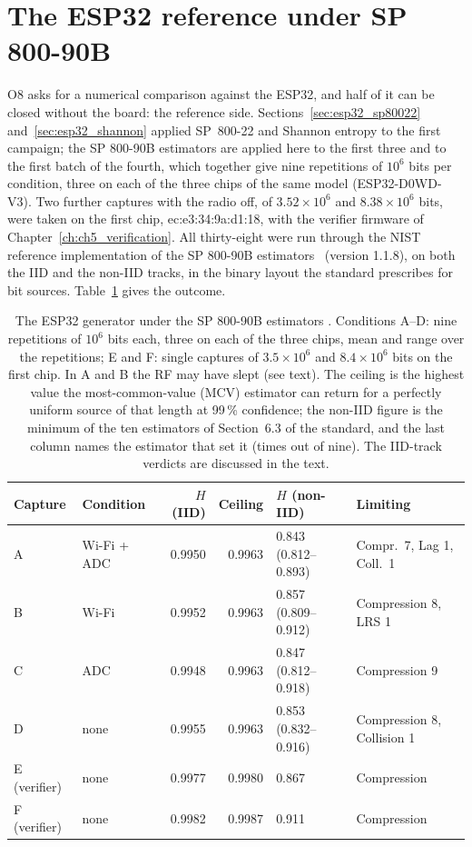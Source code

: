 \section{The ESP32 reference under SP 800-90B}
\label{sec:esp32_90b}

O8 asks for a numerical comparison against the ESP32, and half of it can
be closed without the board: the reference side.
Sections~\ref{sec:esp32_sp80022} and~\ref{sec:esp32_shannon} applied
SP~800-22 and Shannon entropy to the first campaign; the SP 800-90B
estimators are applied here to the first three and to the first batch of
the fourth, which together give nine repetitions of $10^6$ bits per
condition, three on each of the three chips of the same model
(ESP32-D0WD-V3). Two further captures with the radio off, of $3.52\times10^6$
and $8.38\times10^6$ bits, were taken on the first chip,
ec:e3:34:9a:d1:18, with the verifier firmware of
Chapter~\ref{ch:ch5_verification}. All
thirty-eight were run through the \ac{NIST} reference implementation of the
SP 800-90B estimators~\cite{nist_ea_github, turan_2018_sp80090b}
(version 1.1.8), on both the IID and the non-IID tracks, in the binary
layout the standard prescribes for bit sources. Table~\ref{tab:esp32_90b}
gives the outcome.

\begin{table}[htbp]
\centering
\caption{The ESP32 generator under the SP 800-90B estimators \meas{}.
Conditions A--D: nine repetitions of $10^6$ bits each, three on each of
the three chips, mean and range over the repetitions; E and F: single
captures of $3.5\times10^6$ and $8.4\times10^6$ bits on the first chip.
In A and B the RF may have slept (see text). The ceiling is the
highest value the most-common-value (MCV) estimator can return for a
perfectly uniform source of that length at 99\,\% confidence; the non-IID
figure is the minimum of the ten estimators of Section~6.3 of the
standard, and the last column names the estimator that set it (times out
of nine). The IID-track verdicts are discussed in the text.}
\label{tab:esp32_90b}
\footnotesize
\begin{tabular}{@{}llrrll@{}}
\toprule
Capture & Condition & $H$ (IID) & Ceiling & $H$ (non-IID) & Limiting \\
\midrule
A & Wi-Fi + ADC & 0.9950 & 0.9963 & 0.843 (0.812--0.893) & Compr.\ 7, Lag 1, Coll.\ 1 \\
B & Wi-Fi       & 0.9952 & 0.9963 & 0.857 (0.809--0.912) & Compression 8, LRS 1 \\
C & ADC         & 0.9948 & 0.9963 & 0.847 (0.812--0.918) & Compression 9 \\
D & none        & 0.9955 & 0.9963 & 0.853 (0.832--0.916) & Compression 8, Collision 1 \\
E (verifier) & none & 0.9977 & 0.9980 & 0.867 & Compression \\
F (verifier) & none & 0.9982 & 0.9987 & 0.911 & Compression \\
\bottomrule
\end{tabular}
\end{table}

